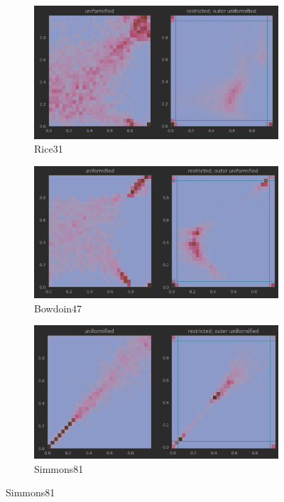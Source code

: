 \begin{figure}
  \centering

  \begin{subfigure}{0.9\textwidth}
    \centering
    \includegraphics[width=\linewidth]{figures/Rice31_2d_diffmaps}
    \caption{Rice31}
    \label{fig:sub1}
  \end{subfigure}

  \vspace{1em}
  
  \begin{subfigure}{0.9\textwidth}
    \centering
    \includegraphics[width=\linewidth]{figures/Bowdoin47_2d_diffmaps}
    \caption{Bowdoin47}
    \label{fig:sub2}
  \end{subfigure}

  \vspace{1em}

  \begin{subfigure}{0.9\textwidth}
    \centering
    \includegraphics[width=\linewidth]{figures/Simmons81_2d_diffmaps.png}
    \caption{Simmons81}
    \label{fig:sub3}
  \end{subfigure}



\end{figure}
